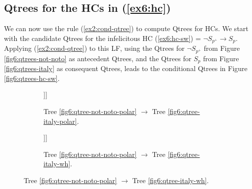 \subsection{Qtrees for the HCs in (\ref{ex6:hc})}\label{sec6:qtrees-hc}

We can now use the rule (\ref{ex2:cond-qtree}) to compute Qtrees for HCs. We start with the candidate Qtrees for the infelicitous HC (\ref{ex6:hc-sw}) = $\neg S_{p^+} \rightarrow S_p$. Applying (\ref{ex2:cond-qtree}) to this LF, using the Qtrees for $\neg S_{p^+}$ from Figure \ref{fig6:qtrees-not-noto} as antecedent Qtrees, and the Qtrees for $S_p$ from Figure \ref{fig6:qtrees-italy} as consequent Qtrees, leads to the conditional Qtrees in Figure \ref{fig6:qtrees-hc-sw}. 

\begin{figure}[H]
\centering
\begin{subfigure}[b]{.45\linewidth}
	\centering
	\scalebox{1}
	{\begin{forest}
			[CS [\textcolor{orange}{Noto}] [{$\neg$\textcolor{orange}{Noto}} [\fbox{\textcolor{blue}{Italy}$\cap\neg$\textcolor{orange}{Noto}}][$\neg$\textcolor{blue}{Italy}]]]
	\end{forest}}
	\caption[]{Tree \ref{fig6:qtree-not-noto-polar} $\rightarrow$ Tree \ref{fig6:qtree-italy-polar}.}\label{fig6:tree-hc-sw-polar-polar}
\end{subfigure}\hfill
\begin{subfigure}[b]{.45\linewidth}
	\centering
	\scalebox{1}
	{\begin{forest}
			[CS [\textcolor{orange}{Noto}] [{$\neg$\textcolor{orange}{Noto}} [\fbox{\textcolor{blue}{Italy}$\cap\neg$\textcolor{orange}{Noto}}][\textcolor{blue}{France}] [\textcolor{blue}{...}]]]
	\end{forest}}
	\caption[]{Tree \ref{fig6:qtree-not-noto-polar} $\rightarrow$ Tree \ref{fig6:qtree-italy-wh}.}\label{fig6:tree-hc-sw-polar-wh}
\end{subfigure}
\end{figure}
